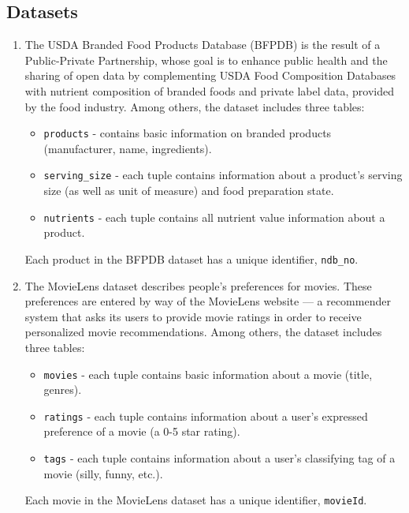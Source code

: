 \subsection{Datasets}
\begin{enumerate}
    \item The USDA Branded Food Products Database (BFPDB) \cite{usda_bfpd-dataset} is the result of a Public-Private Partnership, whose goal is to enhance public health and the sharing of open data by complementing USDA Food Composition Databases with nutrient composition of branded foods and private label data, provided by the food industry. Among others, the dataset includes three tables:
    \begin{itemize}
        \item \texttt{products} - contains basic information on branded products (manufacturer, name, ingredients).
        \item \texttt{serving\_size} - each tuple contains information about a product's serving size (as well as unit of measure) and food preparation state.
        \item \texttt{nutrients} - each tuple contains all nutrient value information about a product.
    \end{itemize}
    Each product in the BFPDB dataset has a unique identifier, \texttt{ndb\_no}.
    
    \item The MovieLens dataset \cite{movielens-dataset} describes people’s preferences for movies. These preferences are entered by way of the MovieLens website \cite{movielens-recommender-website} — a recommender system that asks its users to provide movie ratings in order to receive personalized movie recommendations. Among others, the dataset includes three tables:
    \begin{itemize}
        \item \texttt{movies} - each tuple contains basic information about a movie (title, genres).
        \item \texttt{ratings} - each tuple contains information about a user's expressed preference of a movie (a 0-5 star rating).
        \item \texttt{tags} - each tuple contains information about a user's classifying tag of a movie (silly, funny, etc.).
    \end{itemize}
    Each movie in the MovieLens dataset has a unique identifier, \texttt{movieId}.
\end{enumerate}

